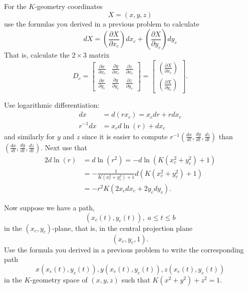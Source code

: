 \documentclass{ximera}
\begin{document}
\begin{problem}
\label{33}For the $K$-geometry coordinates%
\[
X=\left(  x,y,z\right)
\]
use the formulas you derived in a previous problem to calculate%
\[
dX=\left(  \frac{\partial X}{\partial x_{c}}\right)  dx_{c}+\left(
\frac{\partial X}{\partial y_{c}}\right)  dy_{c}%
\]
That is, calculate the $2\times3$ matrix%
\[
D_{c}=\begin{bmatrix}
\frac{\partial x}{\partial x_{c}} & \frac{\partial y}{\partial x_{c}} &
\frac{\partial z}{\partial x_{c}}\\
\frac{\partial x}{\partial y_{c}} & \frac{\partial y}{\partial y_{c}} &
\frac{\partial z}{\partial y_{c}}%
\end{bmatrix} =\begin{bmatrix}
\left(  \frac{\partial X}{\partial x_{c}}\right) \\
\left(  \frac{\partial X}{\partial y_{c}}\right)
\end{bmatrix} .
\]
\begin{hint}
Use logarithmic differentiation:%
\begin{align*}
dx  &  =d\left(  rx_{c}\right)  =x_{c}dr+rdx_{c}\\
r^{-1}dx  &  =x_{c}d\ln\left(  r\right)  +dx_{c}%
\end{align*}
and similarly for $y$ and $z$ since it is easier to compute $r^{-1}\left(
\frac{dx}{dt},\frac{dy}{dt},\frac{dz}{dt}\right)  $ than $\left(  \frac
{dx}{dt},\frac{dy}{dt},\frac{dz}{dt}\right)  $. Next use that%
\begin{align*}
2d\ln\left(  r\right)   &  =d\ln\left(  r^{2}\right)
=-d\ln\left(  K\left(  x_{c}^{2}+y_{c}^{2}\right)  +1\right) \\
&  =-\frac{1}{K\left(  x_{c}^{2}+y_{c}^{2}\right)  +1}d\left(  K\left(
x_{c}^{2}+y_{c}^{2}\right)  +1\right) \\
&  =-r^{2}K\left(  2x_{c}dx_{c}+2y_{c}dy_{c}\right)  .
\end{align*}
\end{hint}
\end{problem}

\begin{problem}
\label{prev}Now suppose we have a path,%
\[
\left(  x_{c}\left(  t\right)  ,y_{c}\left(  t\right)  \right)  ,\;a\leq t\leq
b
\]
in the $\left(  x_{c},y_{c}\right)  $-plane, that is, in the central
projection plane%
\[
\left(  x_{c},y_{c},1\right)  .
\]
Use the formula you derived in a previous problem to write the
corresponding path%
\[
x\left(  x_{c}\left(  t\right)  ,y_{c}\left(  t\right)  \right)  ,y\left(
x_{c}\left(  t\right)  ,y_{c}\left(  t\right)  \right)  ,z\left(  x_{c}\left(
t\right)  ,y_{c}\left(  t\right)  \right)
\]
in the $K$-geometry space of $\left(  x,y,z\right)  $ such that $K\left(
x^{2}+y^{2}\right)  +z^{2}=1$.
\end{problem}
\end{document}
